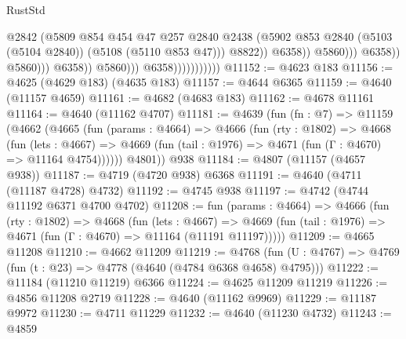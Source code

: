 \begin{lexlean}{RustStd}
\begin{coremodule}
                                                          @2842
                                                          (@5809
                                                            @854
                                                            @454
                                                            @47
                                                            @257
                                                            @2840
                                                            @2438
                                                            (@5902
                                                              @853
                                                              @2840
                                                              (@5103 (@5104 @2840))
                                                              (@5108 (@5110 @853 @47)))
                                                            @8822))
                                                        @6358))
                                                    @5860)))
                                              @6358))
                                          @5860)))
                                    @6358))
                                @5860)))
                          @6358)))))))))))
@11152 := @4623 @183
@11156 := @4625 (@4629 @183) (@4635 @183)
@11157 := @4644 @6365
@11159 := @4640 (@11157 @4659)
@11161 := @4682 (@4683 @183)
@11162 := @4678 @11161
@11164 := @4640 (@11162 @4707)
@11181 := @4639
    (fun (fn : @7) =>
    @11159
      (@4662
        (@4665
          (fun (params : @4664) =>
          @4666
            (fun (rty : @1802) =>
            @4668
              (fun (lets : @4667) =>
              @4669 (fun (tail : @1976) => @4671 (fun (Γ : @4670) => @11164 @4754))))))
        @4801))
    @938
@11184 := @4807 (@11157 (@4657 @938))
@11187 := @4719 (@4720 @938) @6368
@11191 := @4640 (@4711 (@11187 @4728) @4732)
@11192 := @4745 @938
@11197 := @4742 (@4744 @11192 @6371 @4700 @4702)
@11208 := fun (params : @4664) =>
  @4666
    (fun (rty : @1802) =>
    @4668
      (fun (lets : @4667) =>
      @4669 (fun (tail : @1976) => @4671 (fun (Γ : @4670) => @11164 (@11191 @11197)))))
@11209 := @4665 @11208
@11210 := @4662 @11209
@11219 := @4768
    (fun (U : @4767) => @4769 (fun (t : @23) => @4778 (@4640 (@4784 @6368 @4658) @4795)))
@11222 := @11184 (@11210 @11219) @6366
@11224 := @4625 @11209 @11219
@11226 := @4856 @11208 @2719
@11228 := @4640 (@11162 @9969)
@11229 := @11187 @9972
@11230 := @4711 @11229
@11232 := @4640 (@11230 @4732)
@11243 := @4859

\end{coremodule}
\end{lexlean}
